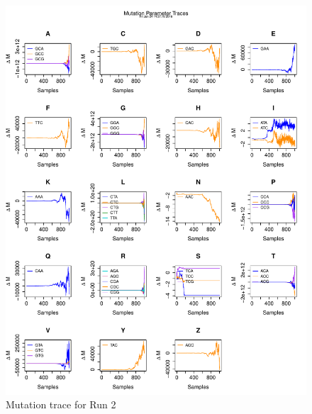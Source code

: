 \documentclass[11pt]{labbook}
\begin{document}
\begin{itemize}
\begin{figure}
        \includegraphics[scale=.65]{FONSE_Plots/2016/June_24/Run2_MutationTrace}
        \caption{Mutation trace for Run 2}
        \label{fig:JUN24_MUT_R2}
    \end{figure}
    \begin{figure}
        \centering

\end{figure}
\end{itemize}
\end{document}
